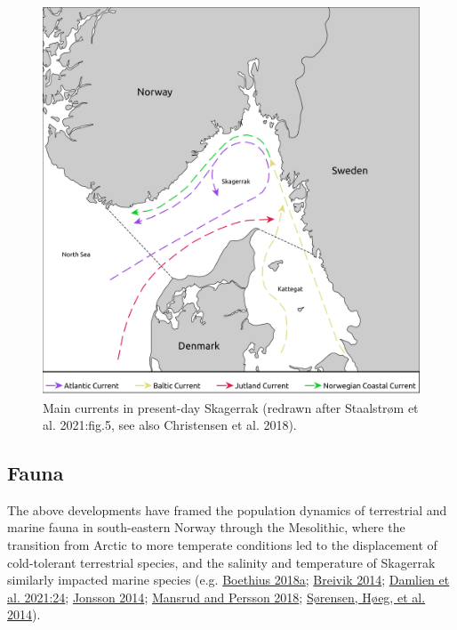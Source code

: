 \documentclass[
  12pt,
  a4paper,
  oneside]{book}
\begin{document}
\begin{figure}

{\centering \includegraphics[width=1.05\linewidth,height=0.8\textheight]{figures/circulation} 

}

\caption{Main currents in present-day Skagerrak (redrawn after Staalstrøm et al. 2021:fig.5, see also Christensen et al. 2018).}\label{fig:circulation}
\end{figure}

\hypertarget{fauna}{%
\subsection{Fauna}\label{fauna}}

The above developments have framed the population dynamics of terrestrial and marine fauna in south-eastern Norway through the Mesolithic, where the transition from Arctic to more temperate conditions led to the displacement of cold-tolerant terrestrial species, and the salinity and temperature of Skagerrak similarly impacted marine species (e.g. \protect\hyperlink{ref-boethius2018}{Boethius 2018a}; \protect\hyperlink{ref-breivik2014}{Breivik 2014}; \protect\hyperlink{ref-damlien2021}{Damlien et al. 2021:24}; \protect\hyperlink{ref-jonsson2014}{Jonsson 2014}; \protect\hyperlink{ref-mansrud2018}{Mansrud and Persson 2018}; \protect\hyperlink{ref-suxf8rensen2014b}{Sørensen, Høeg, et al. 2014}).
\end{document}

